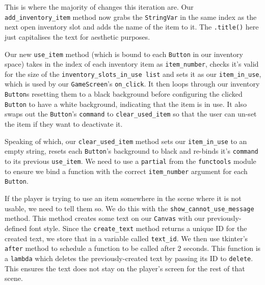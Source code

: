 \documentclass[a4paper,11pt,openany]{book}
\begin{document}
This is where the majority of changes this iteration are. Our \lstinline[columns=fixed]{add_inventory_item} method now grabs the \lstinline[columns=fixed]{StringVar} in the same index as the next open inventory slot and adds the name of the item to it. The \lstinline[columns=fixed]{.title()} here just capitalises the text for aesthetic purposes. 

\vspace{5mm}

Our new \lstinline[columns=fixed]{use_item} method (which is bound to each \lstinline[columns=fixed]{Button} in our inventory space) takes in the index of each inventory item as \lstinline[columns=fixed]{item_number}, checks it's valid for the size of the \lstinline[columns=fixed]{inventory_slots_in_use list} and sets it as our \lstinline[columns=fixed]{item_in_use}, which is used by our \lstinline[columns=fixed]{GameScreen}'s \lstinline[columns=fixed]{on_click}. It then loops through our inventory \lstinline[columns=fixed]{Button}s resetting them to a black background before configuring the clicked \lstinline[columns=fixed]{Button} to have a white background, indicating that the item is in use. It also swaps out the \lstinline[columns=fixed]{Button}'s \lstinline[columns=fixed]{command} to \lstinline[columns=fixed]{clear_used_item} so that the user can un-set the item if they want to deactivate it. 

\vspace{5mm}

Speaking of which, our \lstinline[columns=fixed]{clear_used_item} method sets our \lstinline[columns=fixed]{item_in_use} to an empty string, resets each \lstinline[columns=fixed]{Button}'s background to black and re-binds it's \lstinline[columns=fixed]{command} to its previous \lstinline[columns=fixed]{use_item}. We need to use a \lstinline[columns=fixed]{partial} from the \lstinline[columns=fixed]{functools} module to ensure we bind a function with the correct \lstinline[columns=fixed]{item_number} argument for each \lstinline[columns=fixed]{Button}.

\vspace{5mm}

If the player is trying to use an item somewhere in the scene where it is not usable, we need to tell them so. We do this with the \lstinline[columns=fixed]{show_cannot_use_message} method. This method creates some text on our \lstinline[columns=fixed]{Canvas} with our previously-defined font style. Since the \lstinline[columns=fixed]{create_text} method returns a unique ID for the created text, we store that in a variable called \lstinline[columns=fixed]{text_id}. We then use tkinter's \lstinline[columns=fixed]{after} method to schedule a function to be called after 2 seconds. This function is a \lstinline[columns=fixed]{lambda} which deletes the previously-created text by passing its ID to \lstinline[columns=fixed]{delete}. This ensures the text does not stay on the player's screen for the rest of that scene. 
\end{document}
